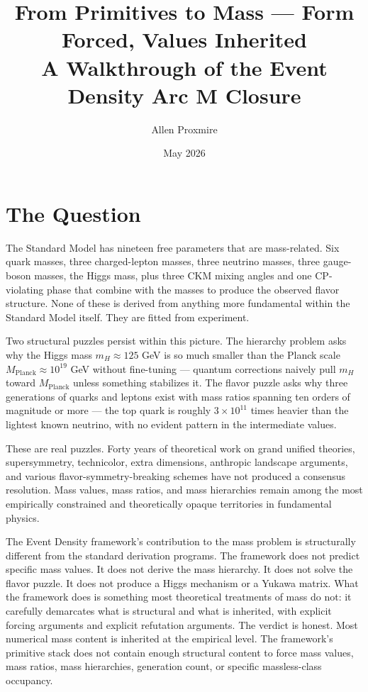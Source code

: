 \documentclass[11pt,a4paper]{article}
\title{\vspace{-1cm}\Large\bfseries From Primitives to Mass --- Form Forced, Values Inherited\\[6pt]
\large\mdseries A Walkthrough of the Event Density Arc M Closure}
\author{Allen Proxmire}
\date{May 2026}
\begin{document}
\maketitle
\thispagestyle{empty}

\section{The Question}

The Standard Model has nineteen free parameters that are mass-related. Six quark masses, three charged-lepton masses, three neutrino masses, three gauge-boson masses, the Higgs mass, plus three CKM mixing angles and one CP-violating phase that combine with the masses to produce the observed flavor structure. None of these is derived from anything more fundamental within the Standard Model itself. They are fitted from experiment.

Two structural puzzles persist within this picture. The hierarchy problem asks why the Higgs mass $m_H \approx 125$ GeV is so much smaller than the Planck scale $M_{\mathrm{Planck}} \approx 10^{19}$ GeV without fine-tuning --- quantum corrections naively pull $m_H$ toward $M_{\mathrm{Planck}}$ unless something stabilizes it. The flavor puzzle asks why three generations of quarks and leptons exist with mass ratios spanning ten orders of magnitude or more --- the top quark is roughly $3 \times 10^{11}$ times heavier than the lightest known neutrino, with no evident pattern in the intermediate values.

These are real puzzles. Forty years of theoretical work on grand unified theories, supersymmetry, technicolor, extra dimensions, anthropic landscape arguments, and various flavor-symmetry-breaking schemes have not produced a consensus resolution. Mass values, mass ratios, and mass hierarchies remain among the most empirically constrained and theoretically opaque territories in fundamental physics.

The Event Density framework's contribution to the mass problem is structurally different from the standard derivation programs. The framework does not predict specific mass values. It does not derive the mass hierarchy. It does not solve the flavor puzzle. It does not produce a Higgs mechanism or a Yukawa matrix. What the framework does is something most theoretical treatments of mass do not: it carefully demarcates what is structural and what is inherited, with explicit forcing arguments and explicit refutation arguments. The verdict is honest. Most numerical mass content is inherited at the empirical level. The framework's primitive stack does not contain enough structural content to force mass values, mass ratios, mass hierarchies, generation count, or specific massless-class occupancy.
\end{document}
